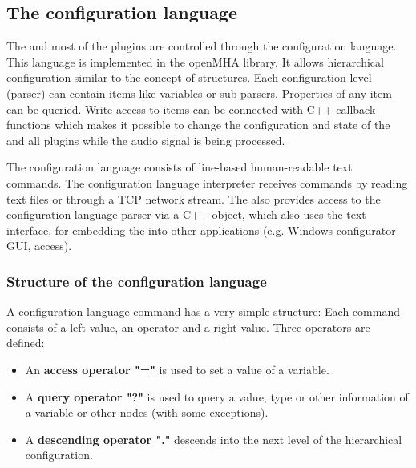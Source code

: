 
\subsection{The \mha{} configuration language}
\label{sec:script}

The \mhad{} and most of the \mha{} plugins are controlled
through the \mha{} configuration language. This language is implemented in the
openMHA library. It allows hierarchical configuration similar to the
concept of \Matlab{} structures. 
Each configuration level (parser)
can contain items like variables or sub-parsers. Properties of any item can be
queried.  Write access to items can be connected with C++ callback functions
which makes it possible to change the configuration and state of the \mha{} 
and all plugins while the audio signal is being processed.

The \mha{} configuration language consists of line-based human-readable
text commands.
The \mha{} configuration language interpreter receives commands by
reading text files or through a TCP network stream.  
The \mha{} also provides access to the configuration language parser via
a C++ object, 
which also uses the text interface,
for embedding the \mha{} into other applications (e.g. Windows \mha{}
configurator GUI, \Matlab{} access).

\subsubsection{Structure of the \mha{} configuration language}

A \mha{} configuration language command has a very simple structure: Each
command consists of a left value, an operator and a
right value. Three operators are defined:

%
%
%
\begin{itemize}
\item An {\bf access operator "="} is used to set a value of a variable.
\item A {\bf query operator "?"}
  is used to query a value, type or other information of a variable or other
  nodes (with some exceptions).
\item A {\bf descending operator "."} descends into the next level of the
  hierarchical \mha{} configuration.
\end{itemize}

